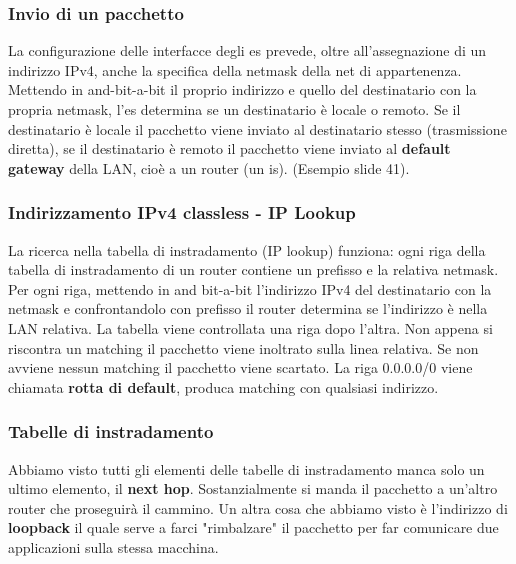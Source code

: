 \documentclass{article}
\begin{document}
\subsubsection{Invio di un pacchetto}
La configurazione delle interfacce degli es prevede, oltre all'assegnazione di un indirizzo IPv4, anche la specifica della netmask della net di appartenenza. Mettendo in and-bit-a-bit il proprio indirizzo e quello del destinatario con la propria netmask, l'es determina se un destinatario è locale o remoto. Se il destinatario è locale il pacchetto viene inviato al destinatario stesso (trasmissione diretta), se il destinatario è remoto il pacchetto viene inviato al \textbf{default gateway} della LAN, cioè a un router (un is). (Esempio slide 41).
\subsubsection{Indirizzamento IPv4 classless - IP Lookup}
La ricerca nella tabella di instradamento (IP lookup) funziona: ogni riga della tabella di instradamento di un router contiene un prefisso e la relativa netmask. Per ogni riga, mettendo in and bit-a-bit l'indirizzo IPv4 del destinatario con la netmask e confrontandolo con prefisso il router determina se l'indirizzo è nella LAN relativa. La tabella viene controllata una riga dopo l'altra. Non appena si riscontra un matching il pacchetto viene inoltrato sulla linea relativa. Se non avviene nessun matching il pacchetto viene scartato. La riga 0.0.0.0/0 viene chiamata \textbf{rotta di default}, produca matching con qualsiasi indirizzo.
\subsubsection{Tabelle di instradamento}
Abbiamo visto tutti gli elementi delle tabelle di instradamento manca solo un ultimo elemento, il \textbf{next hop}. Sostanzialmente si manda il pacchetto a un'altro router che proseguirà il cammino. Un altra cosa che abbiamo visto è l'indirizzo di \textbf{loopback} il quale serve a farci "rimbalzare" il pacchetto per far comunicare due applicazioni sulla stessa macchina.
\end{document}
